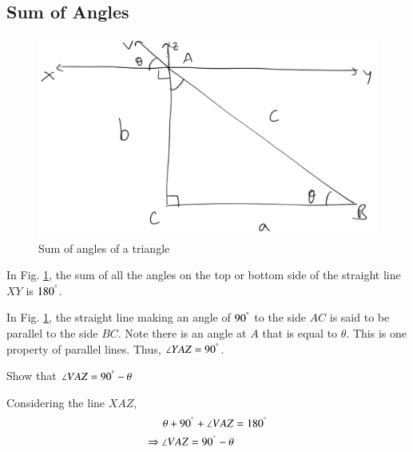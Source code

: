 \subsection{Sum of Angles}
\begin{figure}[!h]
	\begin{center}
		
		\includegraphics[width=\columnwidth]{./figs/ch1_parallel_triangle}
		\vspace*{-10cm}
	\end{center}
	\caption{Sum of angles of a triangle}
	\label{ch1_parallel_triangle}	
\end{figure}

\begin{definition}
	In Fig. \ref{ch1_parallel_triangle}, the sum of all the angles on the top or bottom side of the straight line $XY$ is $180^{\degree}$.
\end{definition}

\begin{definition}
In Fig. \ref{ch1_parallel_triangle}, the straight line making an angle of $90^{\degree}$ to the side $AC$ is said to be parallel to the side $BC$. Note there is an angle at $A$ that is equal to $\theta$.  This is one property of parallel lines.  Thus, $\angle YAZ = 90^{\degree}$.
\end{definition}

\begin{problem}
	Show that $\angle VAZ = 90^{\degree} - \theta$
\end{problem}		
	\proof Considering the line $XAZ$,
	\begin{align}
	\theta + 90^{\degree} + \angle VAZ &= 180^{\degree} \\
	\Rightarrow  \angle VAZ =  90^{\degree} - \theta
	\end{align}

